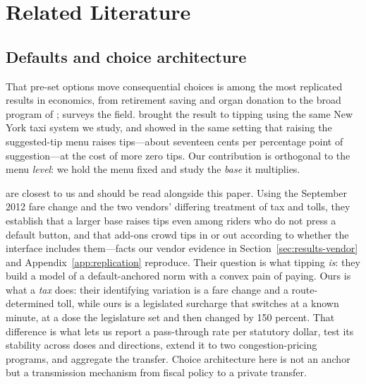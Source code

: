 \section{Related Literature}
\label{sec:related-literature}

\subsection{Defaults and choice architecture}
That pre-set options move consequential choices is among the most
replicated results in economics, from retirement saving
\parencite{madrian2001power, carroll2009optimal} and organ donation
\parencite{johnson2003defaults} to the broad program of
\textcite{thaler2008nudge}; \textcite{dellavigna2009psychology}
surveys the field. \textcite{haggag2014default} brought the result to
tipping using the same New York taxi system we study, and
\textcite{alexander2021recommendations} showed in the same setting
that raising the suggested-tip menu raises tips---about seventeen
cents per percentage point of suggestion---at the cost of more zero
tips. Our contribution is orthogonal to the menu \emph{level}: we hold
the menu fixed and study the \emph{base} it multiplies.

\textcite{thakral2026five} are closest to us and should be read
alongside this paper. Using the September 2012 fare change and the two
vendors' differing treatment of tax and tolls, they establish that a
larger base raises tips even among riders who do not press a default
button, and that add-ons crowd tips in or out according to whether the
interface includes them---facts our vendor evidence in
Section~\ref{sec:results-vendor} and Appendix~\ref{app:replication}
reproduce. Their question is what tipping \emph{is}: they build a model
of a default-anchored norm with a convex pain of paying. Ours is what a
\emph{tax} does: their identifying variation is a fare change and a
route-determined toll, while ours is a legislated surcharge that
switches at a known minute, at a dose the legislature set and then
changed by 150 percent. That difference is what lets us report a
pass-through rate per statutory dollar, test its stability across doses
and directions, extend it to two congestion-pricing programs, and
aggregate the transfer. Choice architecture here is not an anchor but a
transmission mechanism from fiscal policy to a private transfer.

